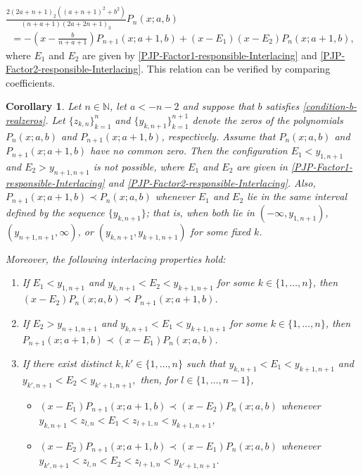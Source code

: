 \documentclass[final,3p,times,12pt]{elsarticle}
\newtheorem{corollary}{Corollary}[section]
\numberwithin{equation}{section}  %
\begin{document}
	
	$\displaystyle \frac{2(2a+n+1)_2\left((a+n+1)^2+b^2\right)}{(n+a+1)(2a+2n+1)_3}P_n(x;a,b)$
	\begin{align}\label{PJ-MixedRR_nab_(n+1)(a+1)b_n(a+1)b}	=-\left(x-\frac{b}{n+a+1}\right)P_{n+1}(x;a+1,b)+(x-E_1)(x-E_2)P_{n}(x;a+1,b),
	\end{align}
	where $E_1$ and $E_2$ are given by \eqref{PJP-Factor1-responsible-Interlacing} and \eqref{PJP-Factor2-responsible-Interlacing}. This relation can be verified by comparing coefficients.
	
	\begin{corollary}\label{PJP-Interlacing-two-points}
	Let $n \in \mathbb{N}$, let $a <-n-2$ and suppose that $b$ satisfies \eqref{condition-b-realzeros}. Let $\{z_{k,n}\}_{k=1}^{n}$ and $\{y_{k,n+1}\}_{k=1}^{n+1}$ denote the zeros of the polynomials $P_n(x;a,b)$ and  $P_{n+1}(x;a+1,b)$, respectively.  Assume that $P_n(x;a,b)$ and $P_{n+1}(x;a+1,b)$ have no common zero. Then the configuration $E_1 < y_{1,n+1}$ and $E_2 > y_{n+1,n+1}$ is not possible,  where $E_1$ and $E_2$ are given in \eqref{PJP-Factor1-responsible-Interlacing} and \eqref{PJP-Factor2-responsible-Interlacing}. Also,  $P_{n+1}(x;a+1,b)\prec P_{n}(x;a,b)$ whenever $E_1$ and $E_2$ lie in the same interval defined by the sequence $\{y_{k,n+1}\}$; that is, when both lie in $(-\infty,y_{1,n+1})$, $(y_{n+1,n+1},\infty)$, or $(y_{k,n+1},y_{k+1,n+1})$ for some fixed $k$.
	
	Moreover, the following interlacing properties hold:
	\begin{enumerate}[label=\alph*)]
		\item If $E_1 < y_{1,n+1}$ and $y_{k,n+1} < E_2 < y_{k+1,n+1}$ for some $k \in \{1,\dots,n\}$, then  $(x-E_2)P_n(x;a,b)\prec P_{n+1}(x;a+1,b)$.
		
		\item If $E_2 > y_{n+1,n+1}$ and $y_{k,n+1} < E_1 < y_{k+1,n+1}$ for some $k \in \{1,\dots,n\}$, then $P_{n+1}(x;a+1,b) \prec (x-E_1)P_n(x;a,b)$.
		
		\item If there exist distinct $k,k' \in \{1,\dots,n\}$ such that 
		$y_{k,n+1} < E_1 < y_{k+1,n+1}$ and $y_{k',n+1} < E_2 < y_{k'+1,n+1},$
		then, for $l\in\{1,\dots,n-1\}$,
		\begin{itemize}
			\item [(i)] $(x-E_1)P_{n+1}(x;a+1,b)\prec (x-E_2)P_n(x;a,b)$ whenever $y_{k,n+1} <z_{l,n}< E_1<z_{l+1,n} < y_{k+1,n+1}$,
			\item[(ii)] $(x-E_2)P_{n+1}(x;a+1,b)\prec (x-E_1)P_n(x;a,b)$ whenever $y_{k',n+1} <z_{l,n}< E_2<z_{l+1,n} < y_{k'+1,n+1}$.
		\end{itemize}  
	\end{enumerate}
	\end{corollary}
\end{document}
